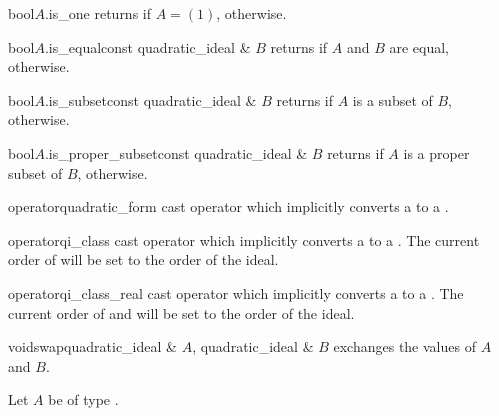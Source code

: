 \begin{cfcode}{bool}{$A$.is_one}{}
  returns \TRUE if $A = (1)$, \FALSE otherwise.
\end{cfcode}

\begin{cfcode}{bool}{$A$.is_equal}{const quadratic_ideal & $B$}
  returns \TRUE if $A$ and $B$ are equal, \FALSE otherwise.
\end{cfcode}

\begin{cfcode}{bool}{$A$.is_subset}{const quadratic_ideal & $B$}
  returns \TRUE if $A$ is a subset of $B$, \FALSE otherwise.
\end{cfcode}

\begin{cfcode}{bool}{$A$.is_proper_subset}{const quadratic_ideal & $B$}
  returns \TRUE if $A$ is a proper subset of $B$, \FALSE otherwise.
\end{cfcode}



\BASIC

\begin{cfcode}{operator}{quadratic_form}{}
  cast operator which implicitly converts a  to a .
\end{cfcode}

\begin{cfcode}{operator}{qi_class}{}
  cast operator which implicitly converts a  to a .  The
  current order of  will be set to the order of the ideal.
\end{cfcode}

\begin{cfcode}{operator}{qi_class_real}{}
  cast operator which implicitly converts a  to a .
  The current order of  and  will be set to the order of the
  ideal.
\end{cfcode}

\begin{fcode}{void}{swap}{quadratic_ideal & $A$, quadratic_ideal & $B$}
  exchanges the values of $A$ and $B$.
\end{fcode}



\HIGH

Let $A$ be of type .

